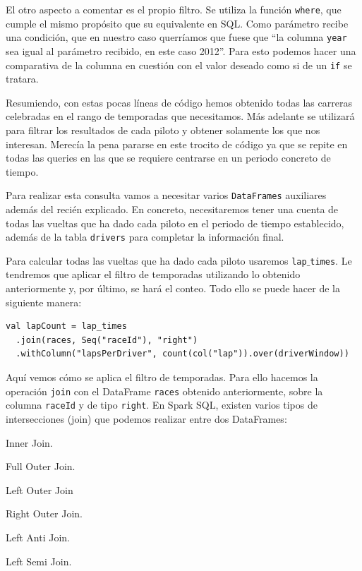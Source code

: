 \documentclass[12pt,twoside,titlepage]{report}
\newcommand{\quotes}[1]{``#1''}
\begin{document}
El otro aspecto a comentar es el propio filtro. Se utiliza la función \texttt{where}, que cumple el mismo propósito que su equivalente en SQL. Como parámetro recibe una condición, que en nuestro caso querríamos que fuese que \quotes{la columna \texttt{year} sea igual al parámetro recibido, en este caso 2012}. Para esto podemos hacer una comparativa de la columna en cuestión con el valor deseado como si de un \texttt{if} se tratara.

Resumiendo, con estas pocas líneas de código hemos obtenido todas las carreras celebradas en el rango de temporadas que necesitamos. Más adelante se utilizará para filtrar los resultados de cada piloto y obtener solamente los que nos interesan. Merecía la pena pararse en este trocito de código ya que se repite en todas las queries en las que se requiere centrarse en un periodo concreto de tiempo.

Para realizar esta consulta vamos a necesitar varios \texttt{DataFrames} auxiliares además del recién explicado. En concreto, necesitaremos tener una cuenta de todas las vueltas que ha dado cada piloto en el periodo de tiempo establecido, además de la tabla \texttt{drivers} para completar la información final.

Para calcular todas las vueltas que ha dado cada piloto usaremos \texttt{lap$\_$times}. Le tendremos que aplicar el filtro de temporadas utilizando lo obtenido anteriormente y, por último, se hará el conteo. Todo ello se puede hacer de la siguiente manera:

\begin{lstlisting}
val lapCount = lap_times
  .join(races, Seq("raceId"), "right")
  .withColumn("lapsPerDriver", count(col("lap")).over(driverWindow))
\end{lstlisting}

Aquí vemos cómo se aplica el filtro de temporadas. Para ello hacemos la operación \texttt{join} con el DataFrame \texttt{races} obtenido anteriormente, sobre la columna \texttt{raceId} y de tipo \texttt{right}. En Spark SQL, existen varios tipos de intersecciones (join) que podemos realizar entre dos DataFrames:

\begin{compactitem}
  \item Inner Join.
  \item Full Outer Join.
  \item Left Outer Join
  \item Right Outer Join.
  \item Left Anti Join.
  \item Left Semi Join.
\end{compactitem}
\end{document}
